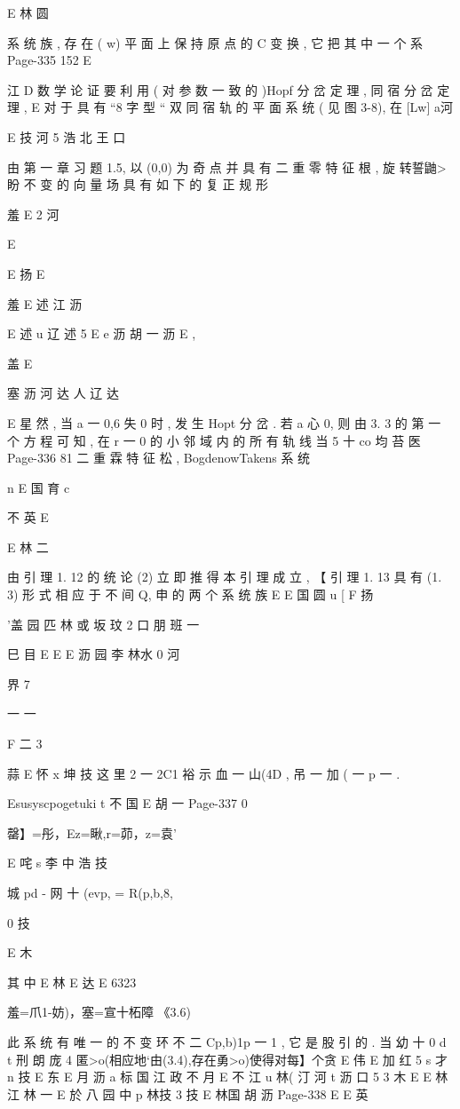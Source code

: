 {{{{{{{{{{{{{{{{{{{{E 林 圆

系 统 族 , 存 在 ( w) 平 面 上 保 持 原 点 的 C 变 换 , 它 把 其 中 一 个 系
Page-335
152 E

江
D
数 学 论 证 要 利 用 ( 对 参 数 一 致 的 )Hopf 分 岔 定 理 , 同 宿 分 岔 定 理 ,
E
对 于 具 有 “8 字 型 “ 双 同 宿 轨 的 平 面 系 统 ( 见 图 3-8), 在 [Lw]
a河

E 技 河 5 浩 北 王 口

由 第 一 章 习 题 1.5, 以 (0,0) 为 奇 点 并 具 有 二 重 零 特 征 根 , 旋
转誓鼬>盼 不 变 的 向 量 场 具 有 如 下 的 复 正 规 形

羞 E 2 河

E

E 扬
E

羞 E 述 江 沥

E 述 u 辽 述 5
E e 沥 胡 一 沥
E ,

盖 E

塞 沥 河 达 人 辽 达

E
星 然 , 当 a 一 0,6 失 0 时 , 发 生 Hopt 分 岔 . 若 a 心 0, 则 由 3. 3 的
第 一 个 方 程 可 知 , 在 r 一 0 的 小 邻 域 内 的 所 有 轨 线 当 5 十 co 均 苔
医
Page-336
81 二 重 霖 特 征 松 , BogdenowTakens 系 统

n
E 国 育 c

不 英
E

E 林 二

由 引 理 1. 12 的 统 论 (2) 立 即 推 得 本 引 理 成 立 , 【
引 理 1. 13 具 有 (1. 3) 形 式 相 应 于 不 间 Q, 申 的 两 个 系 统 族
E
E 国 圆 u
[
F 扬

'盖 园 匹 林 或 坂 玟 2 口 朋 班 一

巳 目
E
E
E 沥 园 李 林水
0 河

界
7

一 一

F 二 3

蒜 E 怀 x 坤 技
这 里 2 一 2C1 裕 示 血 一 山(4D , 吊 一 加 ( 一 p 一 .

Esusyscpogetuki t 不 国
E 胡 一
Page-337
0

罄】=彤，Ez=瞅,r=茆，z=袁'

E 咤 s 李 中 浩 技

城 pd - 网 十 (evp, = R(p,b,8,

0 技

E 木

其 中
E 林
E 达
E 6323

羞=爪1-妨)，塞=宣十柘障 《3.6)

此 系 统 有 唯 一 的 不 变 环 不 二 {Cp,b)1p 一 1} , 它 是 股 引 的 . 当 幼 十
0 d t 刑 朗 庞
4
匿>o(相应地`由(3.4),存在勇>o)使得对每】个贪 E 伟
E 加 红 5 s 才
n 技
E 东
E 月 沥
a 标 国 江 政 不 月
E 不 江 u 林( 汀 河
t 沥 口 5 3 木
E
E 林 江 林 一
E 於 八 园 中 p 林技 3 技
E 林国 胡
沥
Page-338
E E 英

}}}}}}}}}}}}}}}}}}}}
